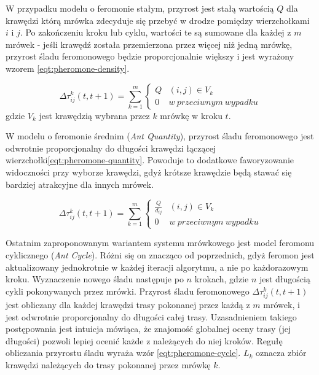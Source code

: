 {    W przypadku modelu o feromonie stałym, przyrost jest stałą wartością $Q$ dla krawędzi którą mrówka zdecyduje się
    przebyć w drodze pomiędzy wierzchołkami $i$ i $j$. Po zakończeniu kroku lub cyklu, wartości te są sumowane dla
    każdej z $m$ mrówek - jeśli krawędź została przemierzona przez więcej niż jedną mrówkę, przyrost śladu feromonowego
    będzie proporcjonalnie większy i jest wyrażony wzorem \ref{eqt:pheromone-density}.

    \begin{equation}\label{eqt:pheromone-density}
        \Delta\tau_{ij}^k(t, t + 1) = \sum_{k=1}^m \left\{
                \begin{matrix}
                    Q & (i, j) \in V_k\\
                    0 & w\ przeciwnym\ wypadku
                \end{matrix}
            \right.
    \end{equation}
    gdzie $V_k$ jest krawędzią wybrana przez $k$ mrówkę w kroku $t$.

    W modelu o feromonie średnim (\textit{Ant Quantity}), przyrost śladu feromonowego jest odwrotnie proporcjonalny do
    długości krawędzi łączącej wierzchołki\ref{eqt:pheromone-quantity}. Powoduje to dodatkowe faworyzowanie widoczności
    przy wyborze krawędzi, gdyż krótsze krawędzie będą stawać się bardziej atrakcyjne dla innych mrówek.

    \begin{equation}\label{eqt:pheromone-quantity}
        \Delta\tau_{ij}^k(t, t + 1) = \sum_{k=1}^m \left\{
                \begin{matrix}
                    \frac{Q}{d_{ij}} & (i, j) \in V_k\\
                    0 & w\ przeciwnym\ wypadku
                \end{matrix}
            \right.
    \end{equation}

    Ostatnim zaproponowanym wariantem systemu mrówkowego jest model feromonu cyklicznego (\textit{Ant Cycle}). Różni się
    on znacząco od poprzednich, gdyż feromon jest aktualizowany jednokrotnie w każdej iteracji algorytmu, a nie po
    każdorazowym kroku. Wyznaczenie nowego śladu następuje po $n$ krokach, gdzie $n$ jest długością cykli pokonywanych
    przez mrówki. Przyrost śladu feromonowego $\Delta\tau_{ij}^k(t, t + 1)$ jest obliczany dla każdej krawędzi trasy
    pokonanej przez każdą z $m$ mrówek, i jest odwrotnie proporcjonalny do długości całej trasy. Uzasadnieniem takiego
    postępowania jest intuicja mówiąca, że znajomość globalnej oceny trasy (jej długości) pozwoli lepiej ocenić każde z
    należących do niej kroków. Regułę obliczania przyrostu śladu wyraża wzór \ref{eqt:pheromone-cycle}. $L_k$
    oznacza zbiór krawędzi należących do trasy pokonanej przez mrówkę $k$.

}
